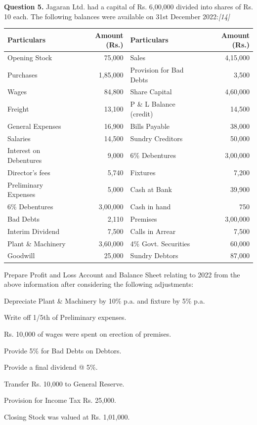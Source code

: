 \documentclass[11pt,a4paper]{article}
\newcommand{\pts}[1]{\hfill   \textit{[#1]}}
\begin{document}
\noindent   \textbf{Question 5.}
Jagaran Ltd. had a capital of Rs. 6,00,000 divided into shares of Rs. 10 each. The following balances were available on 31st December 2022:\pts{14}

\begin{center}
  \small
  
\begin{tabular}{|l|r||l|r|}
    \hline
   \textbf{Particulars} &   \textbf{Amount (Rs.)} &   \textbf{Particulars} &   \textbf{Amount (Rs.)} \\
    \hline
    Opening Stock & 75,000 & Sales & 4,15,000 \\
    Purchases & 1,85,000 & Provision for Bad Debts & 3,500 \\
    Wages & 84,800 & Share Capital & 4,60,000 \\
    Freight & 13,100 & P \& L Balance (credit) & 14,500 \\
    General Expenses & 16,900 & Bills Payable & 38,000 \\
    Salaries & 14,500 & Sundry Creditors & 50,000 \\
    Interest on Debentures & 9,000 & 6\% Debentures & 3,00,000 \\
    Director's fees & 5,740 & Fixtures & 7,200 \\
    Preliminary Expenses & 5,000 & Cash at Bank & 39,900 \\
    6\% Debentures & 3,00,000 & Cash in hand & 750 \\
    Bad Debts & 2,110 & Premises & 3,00,000 \\
    Interim Dividend & 7,500 & Calls in Arrear & 7,500 \\
    Plant \& Machinery & 3,60,000 & 4\% Govt. Securities & 60,000 \\
    Goodwill & 25,000 & Sundry Debtors & 87,000 \\
    \hline
  \end{tabular}
\end{center}
Prepare Profit and Loss Account and Balance Sheet relating to 2022 from the above information after considering the following adjustments:

\begin{parts}
  \item Depreciate Plant \& Machinery by 10\% p.a. and fixture by 5\% p.a.
  \item Write off 1/5th of Preliminary expenses.
  \item Rs. 10,000 of wages were spent on erection of premises.
  \item Provide 5\% for Bad Debts on Debtors.
  \item Provide a final dividend @ 5\%.
  \item Transfer Rs. 10,000 to General Reserve.
  \item Provision for Income Tax Rs. 25,000.
  \item Closing Stock was valued at Rs. 1,01,000.
\end{parts}
\end{document}
